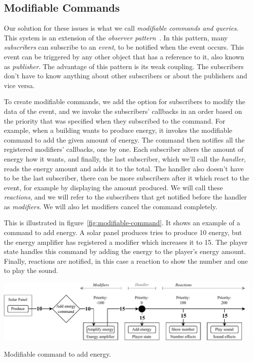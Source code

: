 \subsection{Modifiable Commands}

Our solution for these issues is what we call \emph{modifiable commands and queries}.
This system is an extension of the \emph{observer pattern}~\cite{Observer}.
In this pattern, many \emph{subscribers} can subscribe to an \emph{event}, to be notified when the event occurs.
This event can be triggered by any other object that has a reference to it, also known as \emph{publisher}.
The advantage of this pattern is its weak coupling.
The subscribers don't have to know anything about other subscribers or about the publishers and vice versa.

To create modifiable commands, we add the option for subscribers to modify the data of the event, and we invoke the subscribers' callbacks in an order based on the priority that was specified when they subscribed to the command.
For example, when a building wants to produce energy, it invokes the modifiable command to add the given amount of energy.
The command then notifies all the registered modifiers' callbacks, one by one.
Each subscriber alters the amount of energy how it wants, and finally, the last subscriber, which we'll call the \emph{handler}, reads the energy amount and adds it to the total.
The handler also doesn't have to be the last subscriber, there can be more subscribers after it which react to the event, for example by displaying the amount produced.
We will call these \emph{reactions}, and we will refer to the subscribers that get notified before the handler as \emph{modifiers}.
We will also let modifiers cancel the command completely.

This is illustrated in figure~\ref{fig:modifiable-command}.
It shows an example of a command to add energy.
A solar panel produces tries to produce 10 energy, but the energy amplifier has registered a modifier which increases it to 15.
The player state handles this command by adding the energy to the player's energy amount.
Finally, reactions are notified, in this case a reaction to show the number and one to play the sound.

\begin{center}
    \captionsetup{type=figure}
    \includegraphics[width=\textwidth]{img/modifiable command.pdf}
    \caption{Modifiable command to add energy.}
    \label{fig:modifiable-command}
\end{center}

